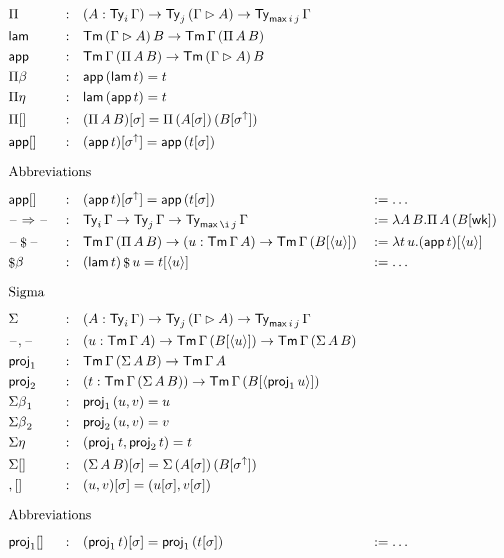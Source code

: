 \documentclass{article}
\begin{document}
\begin{alignat*}{5}
  & \Pi && : && (A:\Ty_i\,\Gamma)\ra\Ty_j\,(\Gamma\rhd A)\ra\Ty_{\max\,i\,j}\,\Gamma \\
  & \lam && : && \Tm\,(\Gamma\rhd A)\,B\ra\Tm\,\Gamma\,(\Pi\,A\,B) \\
  & \app && : && \Tm\,\Gamma\,(\Pi\,A\,B)\ra\Tm\,(\Gamma\rhd A)\,B \\
  & {\Pi\beta} && : && \app\,(\lam\,t) = t \\
  & {\Pi\eta} && : && \lam\,(\app\,t) = t \\
  & {\Pi[]} && : && (\Pi\,A\,B)[\sigma] = \Pi\,(A[\sigma])\,(B[\sigma^\uparrow]) \\
  & {\app[]} && : && (\app\,t)[\sigma^\uparrow] = \app\,(t[\sigma]) \\
  & \heading{Abbreviations} \\
  & {\app[]} && : && (\app\,t)[\sigma^\uparrow] = \app\,(t[\sigma]) && := \dots \\
  & \blank\Ra\blank && : && \Ty_i\,\Gamma\ra\Ty_j\,\Gamma\ra\Ty_{\max\,\i\,j}\,\Gamma && := \lambda A\,B.\Pi\,A\,(B[\wk]) \\
  & \blank\oldapp\blank && : && \Tm\,\Gamma\,(\Pi\,A\,B)\ra(u : \Tm\,\Gamma\,A)\ra\Tm\,\Gamma\,(B[\lb u\rb]) && := \lambda t\,u.(\app\,t)[\lb u \rb] \\
  & {{\oldapp}\beta} && : && (\lam\,t)\oldapp u = t[\lb u\rb] && := \dots \\
  & \heading{Sigma} \\
  & \Sigma && : && (A:\Ty_i\,\Gamma)\ra\Ty_j\,(\Gamma\rhd A)\ra\Ty_{\max\,i\,j}\,\Gamma \\
  & \blank,\blank && : && (u:\Tm\,\Gamma\,A)\ra\Tm\,\Gamma\,(B[\lb u\rb])\ra\Tm\,\Gamma\,(\Sigma\,A\,B) \\
  & \proj_1 && : && \Tm\,\Gamma\,(\Sigma\,A\,B)\ra\Tm\,\Gamma\,A \\
  & \proj_2 && : && (t:\Tm\,\Gamma\,(\Sigma\,A\,B))\ra\Tm\,\Gamma\,(B[\lb \proj_1\,u\rb]) \\
  & {\Sigma\beta}_1 && : && \proj_1\,(u,v) = u \\
  & {\Sigma\beta}_2 && : && \proj_2\,(u,v) = v \\
  & {\Sigma\eta} && : && (\proj_1\,t, \proj_2\,t) = t \\
  & {\Sigma[]} && : && (\Sigma\,A\,B)[\sigma] = \Sigma\,(A[\sigma])\,(B[\sigma^\uparrow]) \\
  & {,[]} && : && (u,v)[\sigma] = (u[\sigma], v[\sigma]) \\
  & \heading{Abbreviations} \\
  & {\proj_1[]} && : && (\proj_1\,t)[\sigma] = \proj_1\,(t[\sigma]) && := \dots \\

\end{alignat*}
\end{document}
